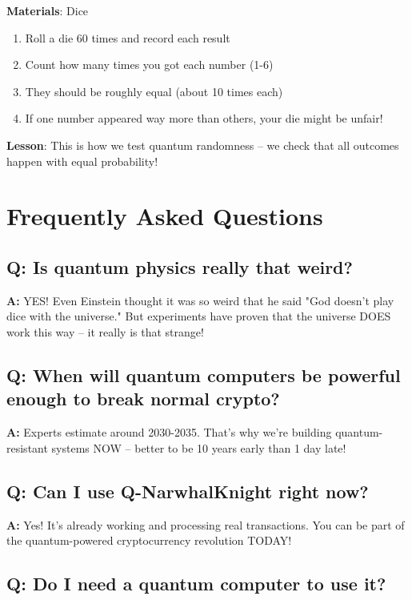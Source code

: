 \documentclass[11pt,a4paper]{article}
\begin{document}
\textbf{Materials}: Dice

\begin{enumerate}
    \item Roll a die 60 times and record each result
    \item Count how many times you got each number (1-6)
    \item They should be roughly equal (about 10 times each)
    \item If one number appeared way more than others, your die might be unfair!
\end{enumerate}

\textbf{Lesson}: This is how we test quantum randomness -- we check that all outcomes happen with equal probability!

\section{Frequently Asked Questions}

\subsection{Q: Is quantum physics really that weird?}

\textbf{A:} YES! Even Einstein thought it was so weird that he said "God doesn't play dice with the universe." But experiments have proven that the universe DOES work this way -- it really is that strange!

\subsection{Q: When will quantum computers be powerful enough to break normal crypto?}

\textbf{A:} Experts estimate around 2030-2035. That's why we're building quantum-resistant systems NOW -- better to be 10 years early than 1 day late!

\subsection{Q: Can I use Q-NarwhalKnight right now?}

\textbf{A:} Yes! It's already working and processing real transactions. You can be part of the quantum-powered cryptocurrency revolution TODAY!

\subsection{Q: Do I need a quantum computer to use it?}
\end{document}
